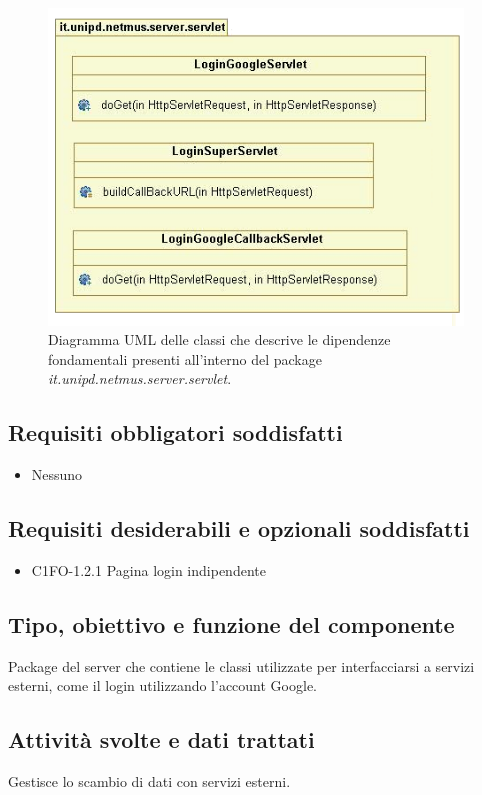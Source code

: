 \begin{figure}[!h]
  \centering
  \includegraphics[width=11cm]{img/DP/classes_servlet.png}
\caption{Diagramma UML delle classi che descrive le dipendenze
fondamentali presenti all'interno del package
\emph{it.unipd.netmus.server.servlet}.}
\end{figure}

\subsection*{Requisiti obbligatori soddisfatti}
\begin{itemize}
	\item Nessuno
\end{itemize}
\subsection*{Requisiti desiderabili e opzionali soddisfatti}
\begin{itemize}
    \item C1FO-1.2.1 Pagina login indipendente
\end{itemize}
\subsection*{Tipo, obiettivo e funzione del componente}
Package del server che contiene le classi utilizzate per interfacciarsi a
servizi esterni, come il login utilizzando l'account Google.
\subsection*{Attivit\`a svolte e dati trattati}
Gestisce lo scambio di dati con servizi esterni.


